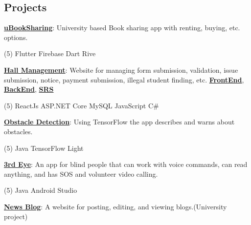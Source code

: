 \documentclass[mm]{simple_style}
\let\oldhref\href
\renewcommand{\href}[2]{\oldhref{#1}{\bfseries#2}}
\begin{document}
\begin{resume}
\section{Projects}
{\href{https://github.com/Sourav9063/uBookSharing}{uBookSharing}}: University based Book sharing app with renting, buying, etc. options.\\
\vspace{-4mm}
\begin{tasks}[style=itemize ,label=\textcolor{gray}{$\bullet$}](5)
\task Flutter
\task Firebase
\task Dart
\task Rive
\end{tasks}
\vspace{-2mm}
\href{https://sourav9063.github.io/hall_management_rf/}{Hall Management}: Website for managing form submission, validation, issue submission, notice, payment submission, illegal student finding, etc. \href{https://github.com/Sourav9063/hall_management_rf}{FrontEnd}, \href{https://github.com/Sourav9063/Backend_hall_management}{BackEnd},
\href{https://docs.google.com/document/d/1Sy9VO97rWJrOYCMgWRGJz4H2q3vJPSVCpLRm5AUOsO8/edit?usp=sharing}{SRS}\\
\vspace{-4mm}
\begin{tasks}[style=itemize ,label=\textcolor{gray}{$\bullet$}](5)
\task ReactJs 
\task ASP.NET Core
\task MySQL 
\task JavaScript
\task  C{\lserif\#}
\end{tasks}
\vspace{-2mm}
\href{https://github.com/Sourav9063/obstacles_detection}{Obstacle Detection}: Using TensorFlow the app describes and warns about obstacles.\\
\vspace{-4mm}
\begin{tasks}[style=itemize ,label=\textcolor{gray}{$\bullet$}](5)
\task Java
\task TensorFlow Light
\end{tasks}
\vspace{-2mm}
\href{https://github.com/Sourav9063/3rdEye}{3rd Eye}: An app for blind people that can work with voice commands, can read anything, and has SOS and volunteer video calling.
\vspace{-4mm}
\begin{tasks}[style=itemize ,label=\textcolor{gray}{$\bullet$}](5)
\task[] \hspace
\task[] \hspace
\task Java
\task Android Studio
\end{tasks}
\vspace{-2mm}
\href{https://github.com/Sourav9063/Blog-CRUD-by-Nodejs}{News Blog}: A website for posting, editing, and viewing blogs.(University project)\\

\end{resume}
\end{document}
